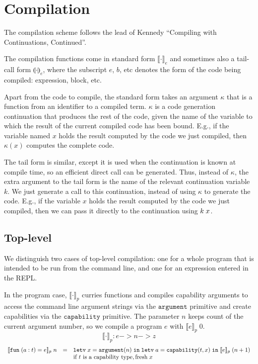 \documentclass[11pt]{article}
\newcommand{\kw}[1]{\mathtt{#1}}
\begin{document}
\newpage

\section{Compilation}

\newcommand{\cmp}[2]{\llbracket #2 \rrbracket_#1}
\newcommand{\cmpn}[1]{\cmp{#1}{\cdot}}
\newcommand{\cmpin}[3]{\cmp{#1}{#2}\;#3}
\newcommand{\cmpk}[2]{\cmp{#1}{#2}\;\kappa}

\newcommand{\tcmp}[2]{\llparenthesis #2 \rrparenthesis_#1}
\newcommand{\tcmpn}[1]{\tcmp{#1}{\cdot}}
\newcommand{\tcmpin}[3]{\tcmp{#1}{#2}\;#3}
\newcommand{\tcmpk}[2]{\tcmp{#1}{#2}\;k}

The compilation scheme follows the lead of Kennedy ``Compiling with Continuations, Continued''.

The compilation functions come in standard form $\cmpn{e}$ and sometimes also a tail-call form $\tcmpn{e}$, where the subscript $e$, $b$, etc denotes the form of the code being compiled: expression, block, etc.

Apart from the code to compile, the standard form takes an argument $\kappa$ that is a function from an identifier to a compiled term.
$\kappa$ is a code generation continuation that produces the rest of the code, given the name of the variable to which the result of the current compiled code has been bound.
E.g., if the variable named $x$ holds the result computed by the code we just compiled, then $\kappa(x)$ computes the complete code.

The tail form is similar, except it is used when the continuation is known at compile time, so an efficient direct call can be generated.
Thus, instead of $\kappa$, the extra argument to the tail form is the name of the relevant continuation variable $k$.
We just generate a call to this continuation, instead of using $\kappa$ to generate the code.
E.g., if the variable $x$ holds the result computed by the code we just compiled, then we can pass it directly to the continuation using $k\;x$.

\subsection*{Top-level}

We distinguish two cases of top-level compilation: one for a whole program that is intended to be run from the command line, and one for an expression entered in the REPL.

In the program case, $\cmpn{p}$ curries functions and compiles capability arguments to access the command line argument strings via the $\kw{argument}$ primitive and create capabilities via the $\kw{capability}$ primitive.
The parameter $n$ keeps count of the current argument number, so we compile a program $e$ with $\cmpin{p}{e}{0}$.
\[
    \cmpn{p} : e -> n -> z
\]
\[
\begin{array}{rcll}
\cmpin{p}{\fune{\arge{a}{t}}{e}}{n} & = &
  \letv{x}{\prmv{\kw{argument}}{n}}{\letv{a}{\prmv{\kw{capability}}{t,x}}{\cmpin{p}{e}{(n + 1)}}} \\
  & &
  \text{if $t$ is a capability type}, \fresh{x} \\
\end{array}
\]
\end{document}
